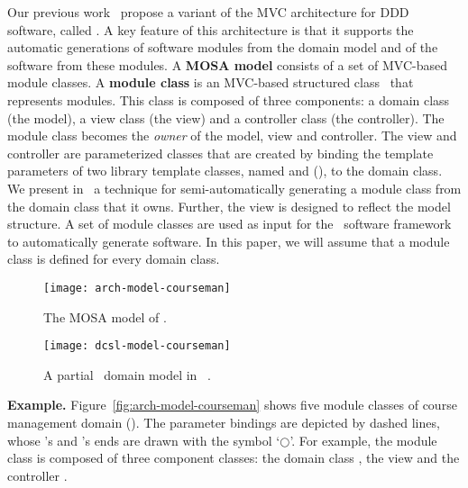 Our previous work~\cite{le_tree-based_2015, le_generative_2018} propose a variant of the MVC architecture for DDD software, called . A key feature of this architecture is that it supports the automatic generations of software modules from the domain model and of the software from these modules.
%
A \textbf{MOSA model} consists of a set of MVC-based module classes. 
A \textbf{module class} is an MVC-based structured class~\cite{omg_unified_2017} that represents modules. This class is composed of three components: a domain class (the model), a view class (the view) and a controller class (the controller). The module class becomes the \textit{owner} of the model, view and controller. The view and controller are parameterized classes that are created by binding the template parameters of two library template classes, named  and  (\resp), to the domain class.
%
We present in~\cite{le_generative_2018} a technique for semi-automatically generating a module class from the domain class that it owns. Further, the view is designed to reflect the model structure. A set of module classes are used as input for the \jdomainapp~software framework~\cite{le_jdomainapp_2017} to automatically generate software. In this paper, we will assume that a module class is defined for every domain class.


\begin{figure}[th]
	\centering
	\begin{minipage}[b]{0.4\textwidth}
		\texttt{[image: arch-model-courseman]}
		\vspace{0.1cm}\caption{The MOSA model of \courseman.}
		\label{fig:arch-model-courseman}
	\end{minipage}
	\hspace{0.5em}
	\begin{minipage}[b]{0.56\textwidth}
		\texttt{[image: dcsl-model-courseman]}
		\vspace{0.1cm}\caption{A partial \courseman~domain model in \dcsl~\cite{le_domain_2018}.}
		\label{fig:dcsl_courseman}
	\end{minipage}
\end{figure}

%
\noindent \textbf{Example.} Figure~\ref{fig:arch-model-courseman} shows five module classes of course management domain (\courseman). The parameter bindings are depicted by dashed lines, whose 's and 's ends are drawn with the symbol `$\bigcirc$'. 
%
For example, the module class  is composed of three component classes: the domain class , the view  and the controller .

